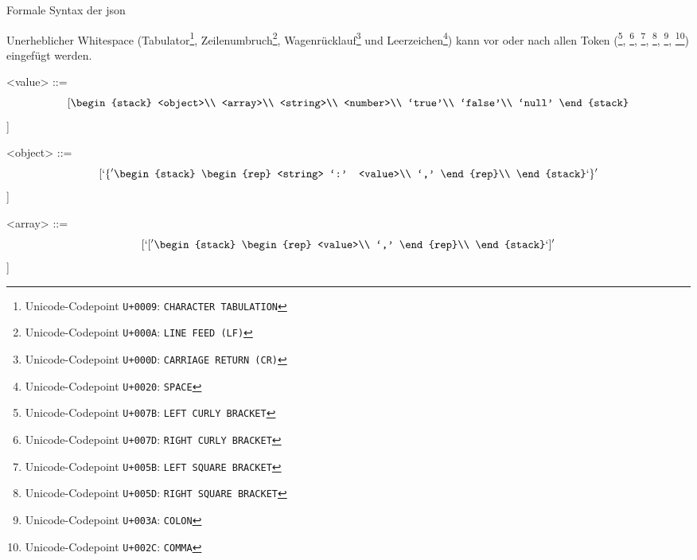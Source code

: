 \begin{definition}Formale Syntax der \acrfull{json}
\label{def:json}

Unerheblicher Whitespace (Tabulator\footnote{Unicode-Codepoint \texttt{U+0009}: \texttt{CHARACTER TABULATION}}, Zeilenumbruch\footnote{Unicode-Codepoint \texttt{U+000A}: \texttt{LINE FEED (LF)}}, Wagenrücklauf\footnote{Unicode-Codepoint \texttt{U+000D}: \texttt{CARRIAGE RETURN (CR)}} und Leerzeichen\footnote{Unicode-Codepoint \texttt{U+0020}: \texttt{SPACE}}) kann vor oder nach allen Token (\lit{\{}\footnote{Unicode-Codepoint \texttt{U+007B}: \texttt{LEFT CURLY BRACKET}}, \lit{\}}\footnote{Unicode-Codepoint \texttt{U+007D}: \texttt{RIGHT CURLY BRACKET}}, \lit{[}\footnote{Unicode-Codepoint \texttt{U+005B}: \texttt{LEFT SQUARE BRACKET}}, \lit{]}\footnote{Unicode-Codepoint \texttt{U+005D}: \texttt{RIGHT SQUARE BRACKET}}, \lit{:}\footnote{Unicode-Codepoint \texttt{U+003A}: \texttt{COLON}}, \lit{,}\footnote{Unicode-Codepoint \texttt{U+002C}: \texttt{COMMA}}) eingefügt werden.

\begin{grammar}
    <value> ::= \[[ \begin{stack}
                <object>\\
                <array>\\
                <string>\\
                <number>\\
                `true'\\
                `false'\\
                `null'
            \end{stack} \]]

    <object> ::= \[[ `\{' \begin{stack}
                \begin{rep}
                    <string> `:' <value>\\
                    `,'
                \end{rep}\\
        \end{stack} `\}' \]]

    <array> ::= \[[ `[' \begin{stack}
                \begin{rep}
                    <value>\\
                    `,'
                \end{rep}\\
        \end{stack} `]' \]]


\end{grammar}
\end{definition}
